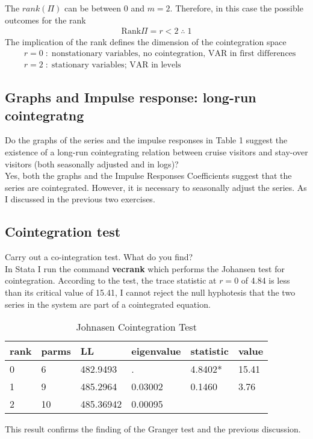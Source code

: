 \documentclass[11pt]{article}
\begin{document}
The $rank(\Pi)$ can be between $0$ and $m=2$. Therefore, in this case the possible outcomes for the rank
\begin{align*}
    \text{Rank}\Pi = r < 2 \; \therefore \; 1
\end{align*}
The implication of the rank defines the dimension of the cointegration space
\begin{align*}
    & r= 0 \; : \; \text{nonstationary variables, no cointegration, VAR in first differences} \\
    & r=2 \; : \; \text{stationary variables; VAR in levels}
\end{align*}

\subsection{Graphs and Impulse response: long-run cointegratng}
Do the graphs of the series and the impulse responses in Table 1 suggest
the existence of a long-run cointegrating relation between cruise visitors
and stay-over visitors (both seasonally adjusted and in logs)? \\

Yes, both the graphs and the Impulse Responses Coefficients suggest that the series are cointegrated. However, it is necessary to seasonally adjust the series. As I discussed in the previous two exercises.

\subsection{Cointegration test}

Carry out a co-integration test. What do you find? \\

In Stata I run the command \textbf{vecrank} which performs the Johansen test for cointegration. According to the test, the trace statistic at $r=0$ of 4.84 is less than its critical value of 15.41, I cannot reject the null hyphotesis that the two series in the system are part of a cointegrated equation. 

\begin{table}[H] \centering
\caption{Johnasen Cointegration Test\label{johnasen}}
\begin{tabular}{llllll}
\toprule
rank & parms & LL        & eigenvalue & statistic & value \\
\midrule
0    & 6     & 482.9493  & .          & 4.8402*   & 15.41 \\
1    & 9     & 485.2964  & 0.03002    & 0.1460    & 3.76  \\
2    & 10    & 485.36942 & 0.00095    &           &      \\
\bottomrule
\end{tabular}
\end{table}
This result confirms the finding of the Granger test and the previous discussion.
\end{document}
